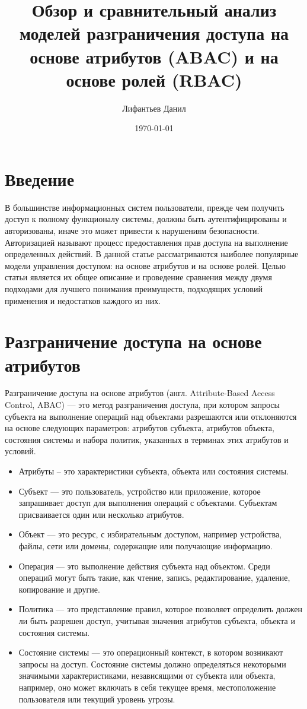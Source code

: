 \documentclass[a4paper,14pt]{article}
\author{Лифантьев Данил}
\title{Обзор и сравнительный анализ моделей разграничения доступа на основе
атрибутов (ABAC) и на основе ролей (RBAC)}
\date{\today}
\begin{document}
\maketitle
\tableofcontents
{}

\section{Введение}

В большинстве информационных систем пользователи, прежде чем получить доступ к полному функционалу системы, должны быть аутентифицированы и авторизованы, иначе это может привести к нарушениям безопасности. Авторизацией называют процесс предоставления прав доступа на выполнение определенных действий. В данной статье рассматриваются наиболее популярные модели управления доступом: на основе атрибутов и на основе ролей. Целью статьи является их общее описание и проведение сравнения между двумя подходами для лучшего понимания преимуществ, подходящих условий применения и недостатков каждого из них. 


\section{Разграничение доступа на основе атрибутов}

Разграничение доступа на основе атрибутов (англ. Attribute-Based Access Control, ABAC) — это метод разграничения доступа, при котором запросы субъекта на выполнение операций над объектами разрешаются или отклоняются на основе следующих параметров: атрибутов субъекта, атрибутов объекта, состояния системы и набора политик, указанных в терминах этих атрибутов и условий.




\begin{itemize}
    \item Атрибуты – это характеристики субъекта, объекта или состояния системы.
    \item Субъект — это пользователь, устройство или приложение, которое запрашивает доступ для выполнения операций с объектами. Субъектам присваивается один или несколько атрибутов.
    \item Объект — это ресурс, с избирательным доступом, например устройства, файлы, сети или домены, содержащие или получающие информацию.
    \item Операция — это выполнение действия субъекта над объектом. Среди операций могут быть такие, как чтение, запись, редактирование, удаление, копирование и другие.
    \item Политика — это представление правил, которое позволяет определить должен ли быть разрешен доступ, учитывая значения атрибутов субъекта, объекта и состояния системы.
    \item Состояние системы — это операционный контекст, в котором возникают запросы на доступ. Состояние системы должно определяться некоторыми значимыми характеристиками, независящими от субъекта или объекта, например, оно может включать в себя текущее время, местоположение пользователя или текущий уровень угрозы.
\end{itemize}
\end{document}
